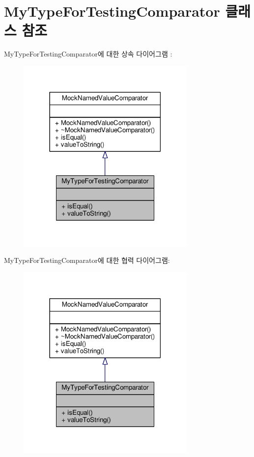 \hypertarget{class_my_type_for_testing_comparator}{}\section{My\+Type\+For\+Testing\+Comparator 클래스 참조}
\label{class_my_type_for_testing_comparator}


My\+Type\+For\+Testing\+Comparator에 대한 상속 다이어그램 \+: 
\nopagebreak
\begin{figure}[H]
\begin{center}
\leavevmode
\includegraphics[width=249pt]{class_my_type_for_testing_comparator__inherit__graph}
\end{center}
\end{figure}


My\+Type\+For\+Testing\+Comparator에 대한 협력 다이어그램\+:
\nopagebreak
\begin{figure}[H]
\begin{center}
\leavevmode
\includegraphics[width=249pt]{class_my_type_for_testing_comparator__coll__graph}
\end{center}
\end{figure}
